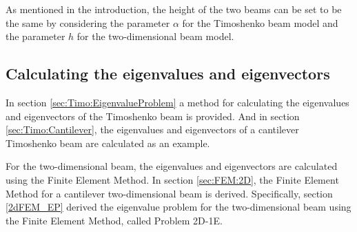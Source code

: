 \documentclass[../../main.tex]{subfiles}
\begin{document}
\begin{figure}[h!]
{{\begin{minipage}[b]{0.8\linewidth}
\begin{center}
				\end{center}
			\end{minipage}
		}
	}
\end{figure}\label{fig:compare:1D+2D}

As mentioned in the introduction, the height of the two beams can be set to be the same by considering the parameter $\alpha$ for the Timoshenko beam model and the parameter $h$ for the two-dimensional beam model.

\subsection{Calculating the eigenvalues and eigenvectors}
In section \ref{sec:Timo:EigenvalueProblem} a method for calculating the eigenvalues and eigenvectors of the Timoshenko beam is provided. And in section \ref{sec:Timo:Cantilever}, the eigenvalues and eigenvectors of a cantilever Timoshenko beam are calculated as an example. 

For the two-dimensional beam, the eigenvalues and eigenvectors are calculated using the Finite Element Method. In section \ref{sec:FEM:2D}, the Finite Element Method for a cantilever two-dimensional beam is derived. Specifically, section \ref{2dFEM_EP} derived the eigenvalue problem for the two-dimensional beam using the Finite Element Method, called Problem 2D-1E.
\end{document}
